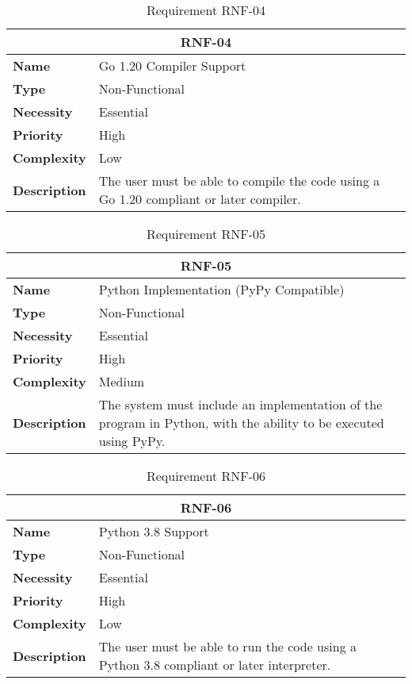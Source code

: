 \begin{table}[H]
    \centering
    \begin{tabular}{l p{10cm}}
        \toprule
        \multicolumn{2}{c}{\textbf{RNF-04}} \\
        \toprule
        \textbf{Name}               & Go 1.20 Compiler Support \\
        \textbf{Type}               & Non-Functional \\
        \textbf{Necessity}          & Essential \\
        \textbf{Priority}           & High \\
        \textbf{Complexity}         & Low \\
        \textbf{Description}        & The user must be able to compile the code using a Go 1.20 compliant or later compiler. \\
        \bottomrule
    \end{tabular}
\caption{Requirement RNF-04}\label{tab:rnf-04}
\end{table}

\begin{table}[H]
    \centering
    \begin{tabular}{l p{10cm}}
        \toprule
        \multicolumn{2}{c}{\textbf{RNF-05}} \\
        \toprule
        \textbf{Name}         & Python Implementation (PyPy Compatible) \\
        \textbf{Type}         & Non-Functional \\
        \textbf{Necessity}    & Essential \\
        \textbf{Priority}     & High \\
        \textbf{Complexity}   & Medium \\
        \textbf{Description}  & The system must include an implementation of the program in Python, with the ability to be executed using PyPy. \\
        \bottomrule
    \end{tabular}
\caption{Requirement RNF-05}\label{tab:rnf-05}
\end{table}

\begin{table}[H]
    \centering
    \begin{tabular}{l p{10cm}}
        \toprule
        \multicolumn{2}{c}{\textbf{RNF-06}} \\
        \toprule
        \textbf{Name}               & Python 3.8 Support \\
        \textbf{Type}               & Non-Functional \\
        \textbf{Necessity}          & Essential \\
        \textbf{Priority}           & High \\
        \textbf{Complexity}         & Low \\
        \textbf{Description}        & The user must be able to run the code using a Python 3.8 compliant or later interpreter. \\
        \bottomrule
    \end{tabular}
\caption{Requirement RNF-06}\label{tab:rnf-06}
\end{table}

